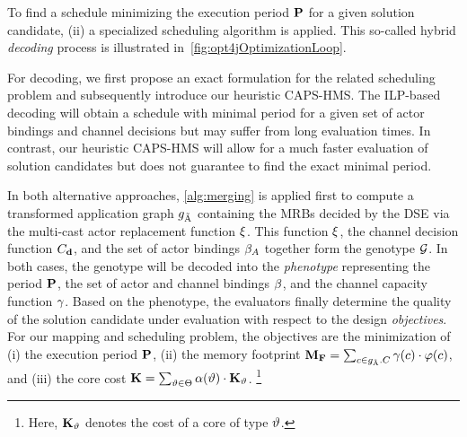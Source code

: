 To find a schedule minimizing the execution period $\mathbf{P}$ for a given solution candidate, (ii) a specialized scheduling algorithm is applied.
This so-called hybrid \emph{decoding} process is illustrated in~\cref{fig:opt4jOptimizationLoop}.
\par
For decoding, we first propose an exact formulation for the related scheduling problem and subsequently introduce our heuristic \acs{CAPS-HMS}.
The \ac{ILP}-based decoding will obtain a schedule with minimal period for a given set of actor bindings and channel decisions but may suffer from long evaluation times.
In contrast, our heuristic \acs{CAPS-HMS} will allow for a much faster evaluation of solution candidates but does not guarantee to find the exact minimal period.
\par
In both alternative approaches, \cref{alg:merging} is applied first to compute a transformed application graph $g_{\tilde{\textrm{A}}}$ containing the \acp{MRB} decided by the \ac{DSE} via the multi-cast actor replacement function $\xi$.
This function $\xi$, the channel decision function $C_\mathtt{\mathbf{d}}$, and the set of actor bindings $\beta_A$ together form the genotype $\mathcal{G}$.
In both cases, the genotype will be decoded into the \emph{phenotype} representing the period $\mathbf{P}$, the set of actor and channel bindings $\beta$, and the channel capacity function $\gamma$.
Based on the phenotype, the evaluators finally determine the quality of the solution candidate under evaluation with respect to the design \emph{objectives}.
For our mapping and scheduling problem, the objectives are the minimization of
(i) the execution period $\mathbf{P}$,
(ii) the memory footprint $\mathbf{M_F} = \sum_{c \in g_{\tilde{\textrm{A}}}.C} \gamma(c) \cdot \varphi(c)$, and
(iii) the core cost $\mathbf{K} = \sum_{\vartheta \in \Theta} \alpha(\vartheta) \cdot \mathbf{K}_\vartheta$.%
\footnote{Here, $\mathbf{K}_\vartheta$ denotes the cost of a core of type $\vartheta$.}
